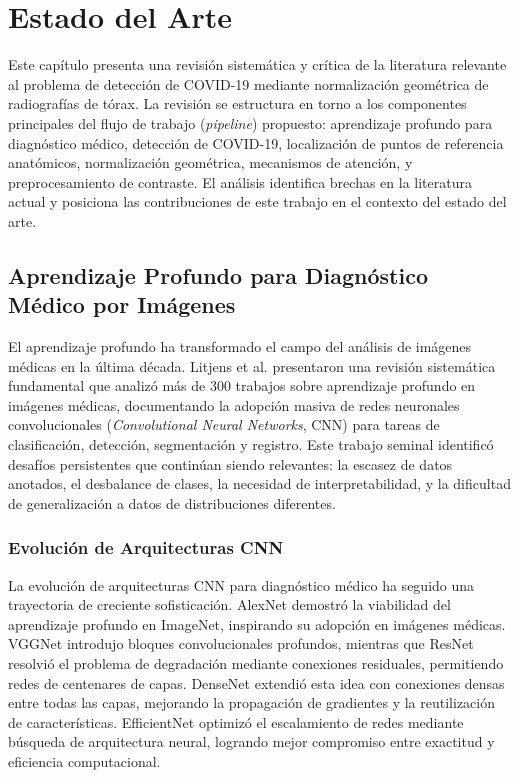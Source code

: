 
\chapter{Estado del Arte}
\label{cap:estado_arte}

Este capítulo presenta una revisión sistemática y crítica de la literatura relevante al problema de detección de COVID-19 mediante normalización geométrica de radiografías de tórax. La revisión se estructura en torno a los componentes principales del flujo de trabajo (\textit{pipeline}) propuesto: aprendizaje profundo para diagnóstico médico, detección de COVID-19, localización de puntos de referencia anatómicos, normalización geométrica, mecanismos de atención, y preprocesamiento de contraste. El análisis identifica brechas en la literatura actual y posiciona las contribuciones de este trabajo en el contexto del estado del arte.

\section{Aprendizaje Profundo para Diagnóstico Médico por Imágenes}
\label{sec:dl_diagnostico_medico}

El aprendizaje profundo ha transformado el campo del análisis de imágenes médicas en la última década. Litjens et al. \cite{litjens2017survey} presentaron una revisión sistemática fundamental que analizó más de 300 trabajos sobre aprendizaje profundo en imágenes médicas, documentando la adopción masiva de redes neuronales convolucionales (\textit{Convolutional Neural Networks}, CNN) para tareas de clasificación, detección, segmentación y registro. Este trabajo seminal identificó desafíos persistentes que continúan siendo relevantes: la escasez de datos anotados, el desbalance de clases, la necesidad de interpretabilidad, y la dificultad de generalización a datos de distribuciones diferentes.

\subsection{Evolución de Arquitecturas CNN}

La evolución de arquitecturas CNN para diagnóstico médico ha seguido una trayectoria de creciente sofisticación. AlexNet \cite{krizhevsky2012imagenet} demostró la viabilidad del aprendizaje profundo en ImageNet, inspirando su adopción en imágenes médicas. VGGNet \cite{simonyan2014very} introdujo bloques convolucionales profundos, mientras que ResNet \cite{he2016deep} resolvió el problema de degradación mediante conexiones residuales, permitiendo redes de centenares de capas. DenseNet \cite{huang2017densely} extendió esta idea con conexiones densas entre todas las capas, mejorando la propagación de gradientes y la reutilización de características. EfficientNet \cite{tan2019efficientnet} optimizó el escalamiento de redes mediante búsqueda de arquitectura neural, logrando mejor compromiso entre exactitud y eficiencia computacional.

